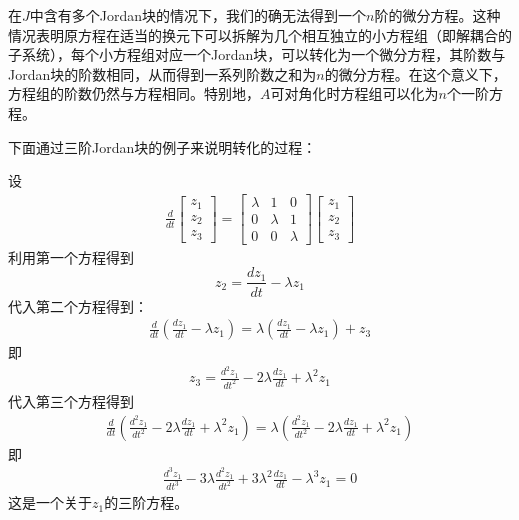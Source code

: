 在$J$中含有多个Jordan块的情况下，我们的确无法得到一个$n$阶的微分方程。这种情况表明原方程在适当的换元下可以拆解为几个相互独立的小方程组（即解耦合的子系统），每个小方程组对应一个Jordan块，可以转化为一个微分方程，其阶数与Jordan块的阶数相同，从而得到一系列阶数之和为$n$的微分方程。在这个意义下，方程组的阶数仍然与方程相同。特别地，$A$可对角化时方程组可以化为$n$个一阶方程。

下面通过三阶Jordan块的例子来说明转化的过程：

\begin{example}
    设\begin{align*}
            \frac{d}{dt}\begin{bmatrix}
                z_1\\
                z_2\\
                z_3
            \end{bmatrix}=\begin{bmatrix}
            \lambda & 1 & 0\\
            0 & \lambda & 1\\
            0 & 0 & \lambda
            \end{bmatrix}\begin{bmatrix}
                z_1\\
                z_2\\
                z_3
            \end{bmatrix}
        \end{align*}
        利用第一个方程得到
        $$z_2=\frac{dz_1}{dt}-\lambda z_1$$
        代入第二个方程得到：\begin{align*}
            \frac{d}{dt}\left(\frac{dz_1}{dt}-\lambda z_1\right)=\lambda\left(\frac{dz_1}{dt}-\lambda z_1\right)+z_3
        \end{align*}
        即\begin{align*}
            z_3=\frac{d^2 z_1}{dt^2}-2\lambda\frac{dz_1}{dt}+\lambda^2 z_1
        \end{align*}
        代入第三个方程得到\begin{align*}
            \frac{d}{dt}\left(\frac{d^2 z_1}{dt^2}-2\lambda\frac{dz_1}{dt}+\lambda^2 z_1\right)=\lambda\left(\frac{d^2 z_1}{dt^2}-2\lambda\frac{dz_1}{dt}+\lambda^2 z_1\right)
        \end{align*}
        即\begin{align*}
            \frac{d^3 z_1}{dt^3}-3\lambda\frac{d^2 z_1}{dt^2}+3\lambda^2\frac{dz_1}{dt}-\lambda^3 z_1=0
        \end{align*}
        这是一个关于$z_1$的三阶方程。
\end{example}

